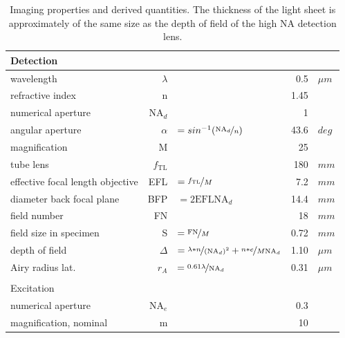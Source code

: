 \documentclass[12pt]{spieman}  %
\begin{document}
		
\begin{landscape}
\begin{table}[t!]
	\centering
		\caption[Resolution]{Imaging properties and derived quantities. The thickness of the light sheet is approximately of the same size as the depth of field of the high NA detection lens.\label{tab:resolution}}
		\begin{tabular}{lrlrl}
		\multicolumn{5}{l}{Detection}\\\hline\hline
		wavelength																	&	$\lambda$				&																																					& 0.5			& $\mu m$	\\
		refractive index														&	n								&																																					& 1.45		& 				\\
		numerical aperture 													&	$\text{NA}_d$		&																																					& 1				& 				\\
		angular aperture 														& $\alpha$				&	$=sin^{-1}(\nicefrac{\text{NA}_d}{n})$																	& 43.6		& $deg$		\\
		magnification 															& M								&																																					& 25			&					\\
		tube lens 																	& $f_{\text{TL}}$	&																																					& 180			&	$mm$		\\
		effective focal length objective						& EFL							& $=\nicefrac{f_{\text{TL}}}{M}$																					& 7.2			& $mm$		\\
		diameter back focal plane										& BFP							& $= 2\text{EFL}\text{NA}_d$																							& 14.4		& $mm$		\\
		field number																& FN							&																																					& 18			& $mm$		\\
		field size in specimen											& S								& $=\nicefrac{\text{FN}}{M}$																							& 0.72		& $mm$		\\
		depth of field															& $\Delta$				& $=\nicefrac{\lambda*n}{(\text{NA}_d)^2}+ \nicefrac{n*e}{M \text{NA}_d}$	& 1.10 		& $\mu m$	\\ 
		Airy radius lat.														& $r_A$						& $=\nicefrac{0.61 \lambda}{\text{NA}_d}$																	& 0.31		& $\mu m$	\\\\
		\multicolumn{5}{l}{Excitation}\\\hline\hline
		numerical aperture 													&	$\text{NA}_e$		&																																					& 0.3			& 				\\
		magnification,	nominal											& m								&																																					& 10			&					\\

\end{tabular}
\end{table}
\end{landscape}
\end{document}
